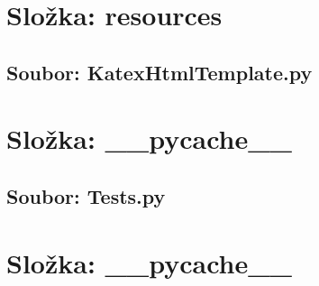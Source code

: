 \documentclass{article}
\begin{document}
\section*{Složka: resources}
\subsection*{Soubor: KatexHtmlTemplate.py}
\begin{itemize}
\end{itemize}
\section*{Složka: \_\_pycache\_\_}
\subsection*{Soubor: Tests.py}
\begin{itemize}
\end{itemize}
\section*{Složka: \_\_pycache\_\_}
\end{document}
